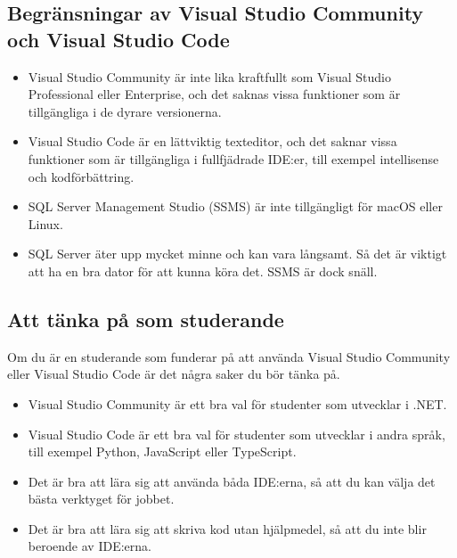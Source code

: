 \hypertarget{begruxe4nsningar-av-visual-studio-community-och-visual-studio-code}{%
\subsection{Begränsningar av Visual Studio Community och Visual Studio
Code}\label{begruxe4nsningar-av-visual-studio-community-och-visual-studio-code}}

\begin{itemize}
\tightlist
\item
  Visual Studio Community är inte lika kraftfullt som Visual Studio
  Professional eller Enterprise, och det saknas vissa funktioner som är
  tillgängliga i de dyrare versionerna.
\item
  Visual Studio Code är en lättviktig texteditor, och det saknar vissa
  funktioner som är tillgängliga i fullfjädrade IDE:er, till exempel
  intellisense och kodförbättring.
\item
  SQL Server Management Studio (SSMS) är inte tillgängligt för macOS
  eller Linux.
\item
  SQL Server äter upp mycket minne och kan vara långsamt. Så det är
  viktigt att ha en bra dator för att kunna köra det. SSMS är dock
  snäll.
\end{itemize}

\hypertarget{att-tuxe4nka-puxe5-som-studerande}{%
\subsection{Att tänka på som
studerande}\label{att-tuxe4nka-puxe5-som-studerande}}

Om du är en studerande som funderar på att använda Visual Studio
Community eller Visual Studio Code är det några saker du bör tänka på.

\begin{itemize}
\tightlist
\item
  Visual Studio Community är ett bra val för studenter som utvecklar i
  .NET.
\item
  Visual Studio Code är ett bra val för studenter som utvecklar i andra
  språk, till exempel Python, JavaScript eller TypeScript.
\item
  Det är bra att lära sig att använda båda IDE:erna, så att du kan välja
  det bästa verktyget för jobbet.
\item
  Det är bra att lära sig att skriva kod utan hjälpmedel, så att du inte
  blir beroende av IDE:erna.
\end{itemize}

